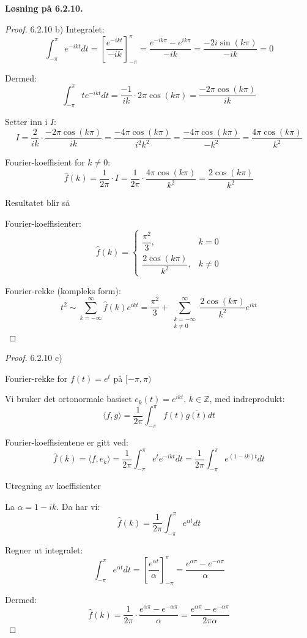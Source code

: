\documentclass[a4paper,norsk]{article}
\newenvironment{oppgave}[1]%
	{\trivlist{}\item\relax\textbf{Løsning på #1.}\medspace}%
	{\endtrivlist}
\begin{document}
\begin{oppgave}{6.2.10}
\begin{proof}{6.2.10 b)}
Integralet:
\[
\int_{-\pi}^{\pi} e^{-ikt}  dt = \left[ \frac{e^{-ikt}}{-ik} \right]_{-\pi}^{\pi} 
= \frac{e^{-ik\pi} - e^{ik\pi}}{-ik} = \frac{-2i\sin(k\pi)}{-ik} = 0
\]

Dermed:
\[
\int_{-\pi}^{\pi} t e^{-ikt}  dt = \frac{-1}{ik} \cdot 2\pi\cos(k\pi) = \frac{-2\pi\cos(k\pi)}{ik}
\]

Setter inn i $I$:
\[
I = \frac{2}{ik} \cdot \frac{-2\pi\cos(k\pi)}{ik} 
= \frac{-4\pi\cos(k\pi)}{i^2 k^2} 
= \frac{-4\pi\cos(k\pi)}{-k^2} 
= \frac{4\pi\cos(k\pi)}{k^2}
\]

Fourier-koeffisient for $k \neq 0$:
\[
\hat{f}(k) = \frac{1}{2\pi} \cdot I = \frac{1}{2\pi} \cdot \frac{4\pi\cos(k\pi)}{k^2} 
= \frac{2\cos(k\pi)}{k^2}
\]

Resultatet blir så

Fourier-koeffisienter:
\[
\hat{f}(k) = 
\begin{cases}
\dfrac{\pi^2}{3}, & k = 0 \\[1em]
\dfrac{2\cos(k\pi)}{k^2}, & k \neq 0
\end{cases}
\]

Fourier-rekke (kompleks form):
\[
t^2 \sim \sum_{k=-\infty}^{\infty} \hat{f}(k)e^{ikt} 
= \frac{\pi^2}{3} + \sum_{\substack{k=-\infty \\ k \neq 0}}^{\infty} \frac{2\cos(k\pi)}{k^2} e^{ikt}
\]
\end{proof}

\begin{proof}{6.2.10 c)}


Fourier-rekke for $f(t) = e^t$ på $[-\pi,\pi)$

Vi bruker det ortonormale basiset $e_k(t) = e^{ikt}$, $k \in \mathbb{Z}$, med indreprodukt:
\[
\langle f, g \rangle = \frac{1}{2\pi} \int_{-\pi}^{\pi} f(t) \overline{g(t)}  dt
\]

Fourier-koeffisientene er gitt ved:
\[
\hat{f}(k) = \langle f, e_k \rangle = \frac{1}{2\pi} \int_{-\pi}^{\pi} e^{t} e^{-ikt}  dt
= \frac{1}{2\pi} \int_{-\pi}^{\pi} e^{(1 - ik)t}  dt
\]

Utregning av koeffisienter

La $\alpha = 1 - ik$. Da har vi:
\[
\hat{f}(k) = \frac{1}{2\pi} \int_{-\pi}^{\pi} e^{\alpha t}  dt
\]

Regner ut integralet:
\[
\int_{-\pi}^{\pi} e^{\alpha t}  dt = \left[ \frac{e^{\alpha t}}{\alpha} \right]_{-\pi}^{\pi}
= \frac{e^{\alpha \pi} - e^{-\alpha \pi}}{\alpha}
\]

Dermed:
\[
\hat{f}(k) = \frac{1}{2\pi} \cdot \frac{e^{\alpha \pi} - e^{-\alpha \pi}}{\alpha}
= \frac{e^{\alpha \pi} - e^{-\alpha \pi}}{2\pi \alpha}
\]


\end{proof}
\end{oppgave}
\end{document}
